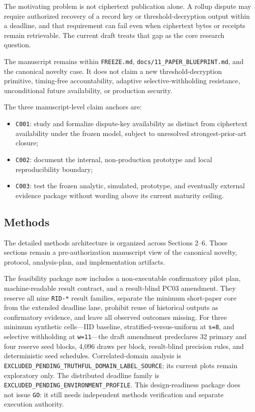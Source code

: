 \documentclass[
]{article}
\providecommand{\tightlist}{%
  \setlength{\itemsep}{0pt}\setlength{\parskip}{0pt}}
\begin{document}
The motivating problem is not ciphertext publication alone. A rollup
dispute may require authorized recovery of a record key or
threshold-decryption output within a deadline, and that requirement can
fail even when ciphertext bytes or receipts remain retrievable. The
current draft treats that gap as the core research question.

The manuscript remains within \texttt{FREEZE.md},
\texttt{docs/11\_PAPER\_BLUEPRINT.md}, and the canonical novelty case.
It does not claim a new threshold-decryption primitive, timing-free
accountability, adaptive selective-withholding resistance, unconditional
future availability, or production security.

The three manuscript-level claim anchors are:

\begin{itemize}
\tightlist
\item
  \texttt{C001}: study and formalize dispute-key availability as
  distinct from ciphertext availability under the frozen model, subject
  to unresolved strongest-prior-art closure;
\item
  \texttt{C002}: document the internal, non-production prototype and
  local reproducibility boundary;
\item
  \texttt{C003}: test the frozen analytic, simulated, prototype, and
  eventually external evidence package without wording above its current
  maturity ceiling.
\end{itemize}

\subsection{Methods}\label{methods}

The detailed methods architecture is organized across Sections 2--6.
Those sections remain a pre-authorization manuscript view of the
canonical novelty, protocol, analysis-plan, and implementation
artifacts.

The feasibility package now includes a non-executable confirmatory pilot
plan, machine-readable result contract, and a result-blind PC03
amendment. They reserve all nine \texttt{RID-*} result families,
separate the minimum short-paper core from the extended deadline lane,
prohibit reuse of historical outputs as confirmatory evidence, and leave
all observed outcomes missing. For three minimum synthetic cells---IID
baseline, stratified-versus-uniform at \texttt{s=8}, and selective
withholding at \texttt{w=11}---the draft amendment predeclares 32
primary and four reserve seed blocks, 4,096 draws per block,
result-blind precision rules, and deterministic seed schedules.
Correlated-domain analysis is
\texttt{EXCLUDED\_PENDING\_TRUTHFUL\_DOMAIN\_LABEL\_SOURCE}; its current
plots remain exploratory only. The distributed deadline family is
\texttt{EXCLUDED\_PENDING\_ENVIRONMENT\_PROFILE}. This design-readiness
package does not issue \texttt{GO}: it still needs independent methods
verification and separate execution authority.
\end{document}
